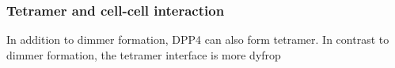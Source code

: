 \subsubsection{Tetramer and cell-cell interaction}

In addition to dimmer formation, DPP4 can also form tetramer. In contrast to dimmer formation, the tetramer interface is more dyfrop